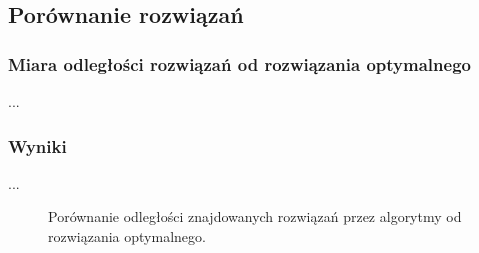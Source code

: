 \subsection{Porównanie rozwiązań}

\subsubsection{Miara odległości rozwiązań od rozwiązania optymalnego}

...

\subsubsection{Wyniki}

...

\begin{figure}
\begin{center}
\end{center}
\caption{Porównanie odległości znajdowanych rozwiązań przez algorytmy od rozwiązania optymalnego.}
\label{fig:dist}
\end{figure}